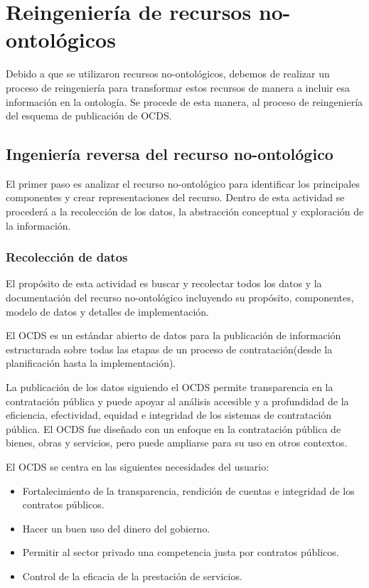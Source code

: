 \section{Reingeniería de recursos no-ontológicos}
Debido a que se utilizaron recursos no-ontológicos, debemos de realizar un proceso de reingeniería para transformar estos recursos de manera a incluir esa información en la ontología. Se procede de esta manera, al proceso de reingeniería del esquema de publicación de OCDS.


\subsection{Ingeniería reversa del recurso no-ontológico}
El primer paso es analizar el recurso no-ontológico para identificar los principales componentes y crear representaciones del recurso. Dentro de esta actividad se procederá a la recolección de los datos, la abstracción conceptual y exploración de la información.

\subsubsection{Recolección de datos}

El propósito de esta actividad es buscar y recolectar todos los datos y la documentación del recurso no-ontológico incluyendo su propósito, componentes, modelo de datos y detalles de implementación.

El OCDS es un estándar abierto de datos para la publicación de información estructurada sobre todas las etapas de un proceso de contratación(desde la planificación hasta la implementación).

La publicación de los datos siguiendo el OCDS permite transparencia en la contratación pública y puede apoyar al análisis accesible y a profundidad de la eficiencia, efectividad, equidad e integridad de los sistemas de contratación pública. El OCDS fue diseñado con un enfoque en la contratación pública de bienes, obras y servicios, pero puede ampliarse para su uso en otros contextos. 

El OCDS se centra en las siguientes necesidades del usuario:
\begin{itemize}
    \item Fortalecimiento de la transparencia, rendición de cuentas e integridad de los contratos públicos.
    \item Hacer un buen uso del dinero del gobierno.
    \item Permitir al sector privado una competencia justa por contratos públicos.
    \item Control de la eficacia de la prestación de servicios. 
\end{itemize}

